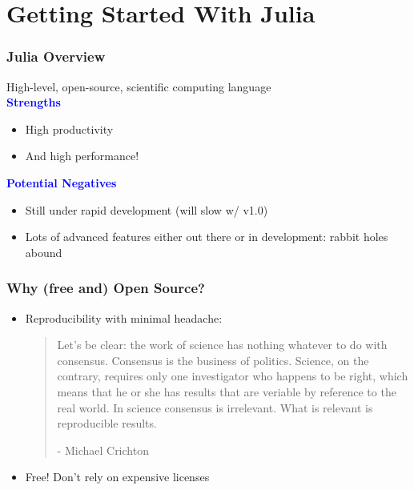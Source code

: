 \documentclass[
  xcolor={svgnames},
  hyperref={colorlinks,citecolor=DeepPink4,linkcolor=DarkRed,urlcolor=DarkBlue}
  ]{beamer}  %
\newcommand\boldblue[1]{\textcolor{blue}{\textbf{#1}}}
\begin{document}
\section{Getting Started With Julia}
\begin{frame}
  \frametitle{Julia Overview}

  High-level, open-source, scientific computing language \\

  \vspace{1em}
  \boldblue{Strengths}
  \begin{itemize}
    \item High productivity
    \item And high performance!
  \end{itemize}

  \pause
  \vspace{1em}
  \boldblue{Potential Negatives}
  \begin{itemize}
    \item Still under rapid development (will slow w/ v1.0)
    \item Lots of advanced features either out there or in development: rabbit holes abound
  \end{itemize}

\end{frame}

\begin{frame}
  \frametitle{Why (free and) Open Source?}

  \begin{itemize}
    \setlength\itemsep{1em}

    \item Reproducibility with minimal headache:

      \begin{quote}
        Let's be clear: the work of science has nothing whatever
        to do with consensus. Consensus is the business of
        politics. Science, on the contrary, requires only one
        investigator who happens to be right, which means that
        he or she has results that are veriable by reference to
        the real world. In science consensus is irrelevant. What is
        relevant is reproducible results.

        \hspace{1em} - Michael Crichton
      \end{quote}
    \pause

    \item Free! Don't rely on expensive licenses
  \end{itemize}
\end{frame}
\end{document}
